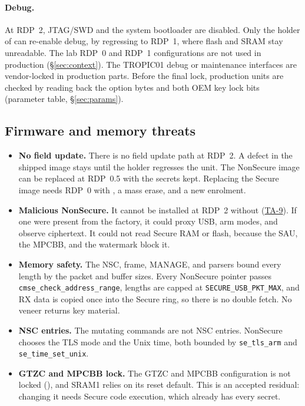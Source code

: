 \documentclass[11pt,a4paper]{article}
\begin{document}
\paragraph{Debug.} At RDP~2, JTAG/SWD and the system bootloader are disabled. Only the holder of  can re-enable debug, by regressing to RDP~1, where flash and SRAM stay unreadable. The lab RDP~0 and RDP~1 configurations are not used in production (\S\ref{sec:context}). The TROPIC01 debug or maintenance interfaces are vendor-locked in production parts. Before the final lock, production units are checked by reading back the option bytes and both OEM key lock bits (parameter table, \S\ref{sec:params}).

\subsection{Firmware and memory threats}
\begin{itemize}
\item \textbf{No field update.} There is no field update path at RDP~2. A defect in the shipped image stays until the  holder regresses the unit. The NonSecure image can be replaced at RDP~0.5 with the secrets kept. Replacing the Secure image needs RDP~0 with , a mass erase, and a new enrolment.
\item \textbf{Malicious NonSecure.} It cannot be installed at RDP~2 without  (\hyperref[ta:TA-9]{TA-9}). If one were present from the factory, it could proxy USB, arm modes, and observe ciphertext. It could not read Secure RAM or flash, because the SAU, the MPCBB, and the watermark block it.
\item \textbf{Memory safety.} The NSC, frame, MANAGE, and  parsers bound every length by the packet and buffer sizes. Every NonSecure pointer passes \texttt{cmse\_check\_address\_range}, lengths are capped at \texttt{SECURE\_USB\_PKT\_MAX}, and RX data is copied once into the Secure ring, so there is no double fetch. No veneer returns key material.
\item \textbf{NSC entries.} The mutating commands are not NSC entries. NonSecure chooses the TLS mode and the Unix time, both bounded by \texttt{se\_tls\_arm} and \texttt{se\_time\_set\_unix}.
\item \textbf{GTZC and MPCBB lock.} The GTZC and MPCBB configuration is not locked (), and SRAM1 relies on its reset default. This is an accepted residual: changing it needs Secure code execution, which already has every secret.
\end{itemize}
\end{document}
